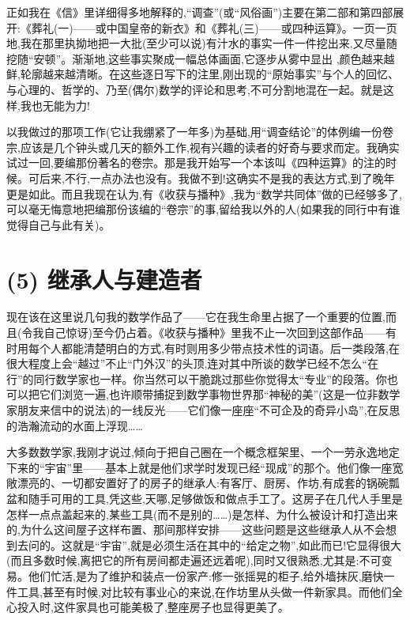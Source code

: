 正如我在《信》里详细得多地解释的,“调查”(或“风俗画”)主要在第二部和第四部展开:《葬礼(一)——或中国皇帝的新衣》和《葬礼(三)——或四种运算》。一页一页地,我在那里执拗地把一大批(至少可以说)有汁水的事实一件一件挖出来,又尽量随挖随“安顿”。渐渐地,这些事实聚成一幅总体画面,它逐步从雾中显出
,颜色越来越鲜,轮廓越来越清晰。在这些逐日写下的注里,刚出现的“原始事实”与个人的回忆、与心理的、哲学的、乃至(偶尔)数学的评论和思考,不可分割地混在一起。就是这样,我也无能为力!

以我做过的那项工作(它让我绷紧了一年多)为基础,用“调查结论”的体例编一份卷宗,应该是几个钟头或几天的额外工作,视有兴趣的读者的好奇与要求而定。我确实试过一回,要编那份著名的卷宗。那是我开始写一个本该叫《四种运算》的注的时候。可后来,不行,一点办法也没有。我做不到!这确实不是我的表达方式,到了晚年更是如此。而且我现在认为,有《收获与播种》,我为“数学共同体”做的已经够多了,可以毫无悔意地把编那份该编的“卷宗”的事,留给我以外的人(如果我的同行中有谁觉得自己与此有关)。

\section{(5) 继承人与建造者}

现在该在这里说几句我的数学作品了——它在我生命里占据了一个重要的位置,而且(令我自己惊讶)至今仍占着。《收获与播种》里我不止一次回到这部作品——有时用每个人都能清楚明白的方式,有时则用多少带点技术性的词语。后一类段落,在很大程度上会“越过”不止“门外汉”的头顶,连对其中所谈的数学已经不怎么“在行”的同行数学家也一样。你当然可以干脆跳过那些你觉得太“专业”的段落。你也可以把它们浏览一遍,也许顺带捕捉到数学事物世界那“神秘的美”(这是一位非数学家朋友来信中的说法)的一线反光——它们像一座座“不可企及的奇异小岛”,在反思的浩瀚流动的水面上浮现……

大多数数学家,我刚才说过,倾向于把自己圈在一个概念框架里、一个一劳永逸地定下来的“宇宙”里——基本上就是他们求学时发现已经“现成”的那个。他们像一座宽敞漂亮的、一切都安置好了的房子的继承人:有客厅、厨房、作坊,有成套的锅碗瓢盆和随手可用的工具,凭这些,天哪,足够做饭和做点手工了。这房子在几代人手里是怎样一点点盖起来的,某些工具(而不是别的……)是怎样、为什么被设计和打造出来的,为什么这间屋子这样布置、那间那样安排——这些问题是这些继承人从不会想到去问的。这就是“宇宙”,就是必须生活在其中的“给定之物”,如此而已!它显得很大(而且多数时候,离把它的所有房间都走遍还远着呢),同时又很熟悉,尤其是:不可变易。他们忙活,是为了维护和装点一份家产:修一张摇晃的柜子,给外墙抹灰,磨快一件工具,甚至有时候,对比较有事业心的来说,在作坊里从头做一件新家具。而他们全心投入时,这件家具也可能美极了,整座房子也显得更美了。

